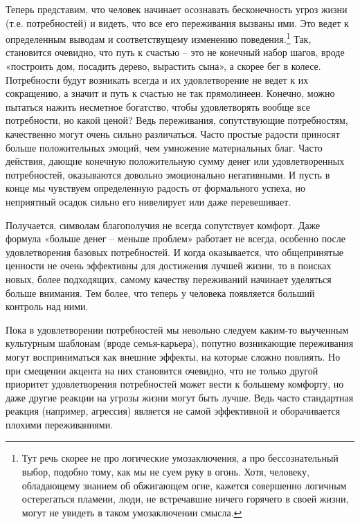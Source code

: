 \documentclass[12pt,a4paper]{report}
\begin{document}
\noindent Теперь представим, что человек начинает осознавать бесконечность угроз жизни (т.е. потребностей) и видеть, что все его переживания вызваны ими. Это ведет к определенным выводам и соответствущему изменению поведения.\footnote{Тут речь скорее не про логические умозаключения, а про бессознательный выбор, подобно тому, как мы не суем руку в огонь. Хотя, человеку, обладающему знанием об обжигающем огне, кажется совершенно логичным остерегаться пламени, люди, не встречавшие ничего горячего в своей жизни, могут не увидеть в таком умозаключении смысла.} Так, становится очевидно, что путь к счастью -- это не конечный набор шагов, вроде «построить дом, посадить дерево, вырастить сына», а скорее бег в колесе. Потребности будут возникать всегда и их удовлетворение не ведет к их сокращению, а значит и путь к счастью не так прямолинеен. Конечно, можно пытаться нажить несметное богатство, чтобы удовлетворять вообще все потребности, но какой ценой? Ведь переживания, сопутствующие потребностям, качественно могут очень сильно различаться. Часто простые радости приносят больше положительных эмоций, чем умножение материальных благ. Часто действия, дающие конечную положительную сумму денег или удовлетворенных потребностей, оказываются довольно эмоционально негативными. И пусть в конце мы чувствуем определенную радость от формального успеха, но неприятный осадок сильно его нивелирует или даже перевешивает.

\noindent Получается, символам благополучия не всегда сопутствует комфорт. Даже формула «больше денег -- меньше проблем» работает не всегда, особенно после удовлетворения базовых потребностей. И когда оказывается, что общепринятые ценности не очень эффективны для достижения лучшей жизни, то в поисках новых, более подходящих, самому качеству переживаний начинает уделяться больше внимания. Тем более, что теперь у человека появляется больший контроль над ними.

\noindent Пока в удовлетворении потребностей мы невольно следуем каким-то выученным культурным шаблонам (вроде семья-карьера), попутно возникающие переживания могут восприниматься как внешние эффекты, на которые сложно повлиять. Но при смещении акцента на них становится очевидно, что не только другой приоритет удовлетворения потребностей может вести к большему комфорту, но даже другие реакции на угрозы жизни могут быть лучше. Ведь часто стандартная реакция (например, агрессия) является не самой эффективной и оборачивается плохими переживаниями.
\end{document}
